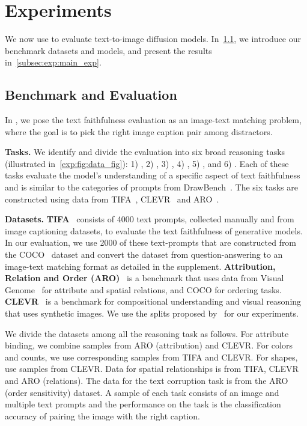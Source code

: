 \section{Experiments}
\label{sec:experiments}

We now use \OURS to evaluate text-to-image diffusion models.
In~\cref{subsec:exp:benchmark}, we introduce our benchmark datasets and models, and present the \OURS results in~\cref{subsec:exp:main_exp}.

\subsection{Benchmark and Evaluation}\label{subsec:exp:benchmark}
In \OURS, we pose the text faithfulness evaluation as an image-text matching problem, where the goal is to pick the right image caption pair among distractors.
\par \noindent \textbf{Tasks.}
We identify and divide the evaluation into six broad reasoning tasks (illustrated in~\cref{exp:fig:data_fig}): 1) ,
 2) , 3) , 4) , 5) , and 6) .
Each of these tasks evaluate the model's understanding of a specific aspect of text faithfulness and is similar to the categories of prompts from DrawBench~\cite{Saharia2022PhotorealisticTD}. 
The six tasks are constructed using data from TIFA~\cite{hu2023tifa}, CLEVR~\cite{Johnson2016CLEVRAD} and ARO~\cite{yuksekgonul2023when}.
\par \noindent \textbf{Datasets.}
\noindent \textbf{TIFA}~\cite{hu2023tifa} consists of 4000 text prompts, collected manually and from image captioning datasets, to evaluate the text faithfulness of generative models.
In our evaluation, we use 2000 of these text-prompts that are constructed from the COCO~\cite{2014-lin} dataset and convert the dataset from question-answering to an image-text matching format as detailed in the supplement.
\noindent \textbf{Attribution, Relation and Order (ARO)}~\cite{yuksekgonul2023when} is a benchmark that uses data from Visual Genome~\cite{vg} for attribute and spatial relations, and COCO for ordering tasks.
\noindent \textbf{CLEVR}~\cite{Johnson2016CLEVRAD} is a benchmark for compositional understanding and visual reasoning that uses synthetic images.
We use the splits proposed by~\cite{Lewis2022DoesCB} for our experiments.

\noindent
We divide the datasets among all the reasoning task as follows. For attribute binding, we combine samples from ARO (attribution) and CLEVR. For colors and counts, we use corresponding samples from TIFA and CLEVR.
For shapes, use samples from CLEVR.
Data for spatial relationships is from TIFA, CLEVR and ARO (relations).
The data for the text corruption task is from the ARO (order sensitivity) dataset.
A sample of each task consists of an image and multiple text prompts and the performance on the task is the classification accuracy of pairing the image with the right caption.

